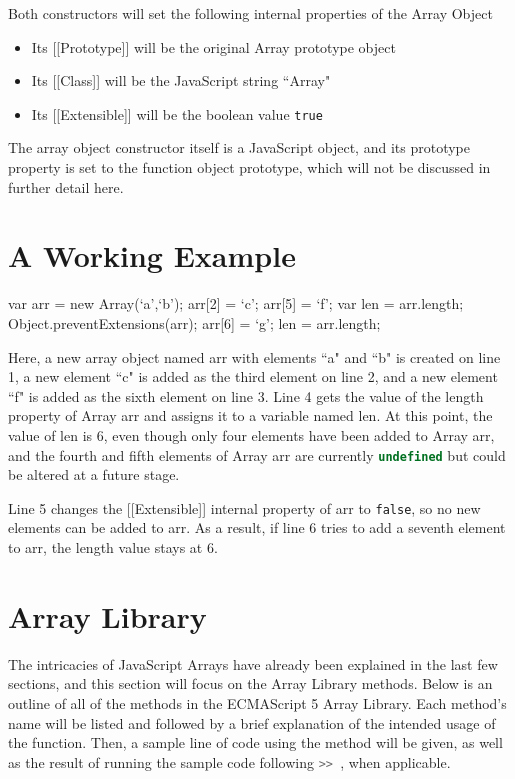 \documentclass[a4paper,11pt,twoside]{report}
\def\jsinline{\lstinline[language=JavaScript, basicstyle=\small]}%\end{lstlisting}
\begin{document}
Both constructors will set the following internal properties of the Array Object
\begin{itemize}
\item Its [[Prototype]] will be the original Array prototype object
\item Its [[Class]] will be the JavaScript string ``Array"
\item Its [[Extensible]] will be the boolean value \texttt{true}
\end{itemize}

The array object constructor itself is a JavaScript object, and its prototype property is set to the function object prototype, which will not be discussed in further detail here.

\section*{A Working Example}
\begin{adjustwidth}{4cm}{4cm}
\begin{lstjs}
var arr = new Array(`a',`b');
arr[2] = `c';
arr[5] = `f';
var len = arr.length;
Object.preventExtensions(arr);
arr[6] = `g';
len = arr.length;
\end{lstjs}
\end{adjustwidth}

Here, a new array object named arr with elements ``a" and ``b" is created on line 1, a new element ``c" is added as the third element on line 2, and a new element ``f" is added as the sixth element on line 3. Line 4 gets the value of the length property of Array arr and assigns it to a variable named len. At this point, the value of len is 6, even though only four elements have been added to Array arr, and the fourth and fifth elements of Array arr are currently \jsinline|undefined| but could be altered at a future stage.

Line 5 changes the [[Extensible]] internal property of arr to \texttt{false}, so no new elements can be added to arr. As a result, if line 6 tries to add a seventh element to arr, the length value stays at 6.

\section{Array Library}
The intricacies of JavaScript Arrays have already been explained in the last few sections, and this section will focus on the Array Library methods. Below is an outline of all of the methods in the ECMAScript 5 Array Library. Each method's name will be listed and followed by a brief explanation of the intended usage of the function. Then, a sample line of code using the method will be given, as well as the result of running the sample code following \jsinline|>> |, when applicable.
\end{document}
